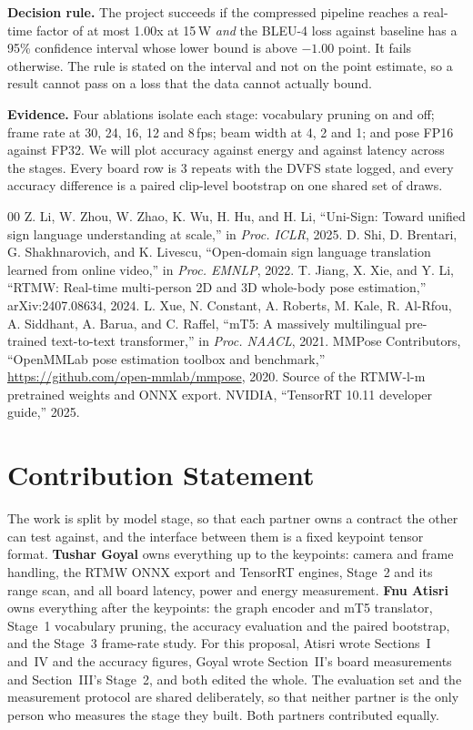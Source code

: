 \documentclass[conference]{IEEEtran}
\begin{document}
\label{m3}\textbf{Decision rule.} The project succeeds if the compressed pipeline reaches a
real-time factor of at most 1.00x at 15\,W \emph{and} the BLEU-4 loss against baseline
has a 95\% confidence interval whose lower bound is above $-1.00$ point. It fails
otherwise. The rule is stated on the interval and not on the point estimate, so a
result cannot pass on a loss that the data cannot actually bound.

\label{evidencestart}\textbf{Evidence.} Four ablations isolate each stage: vocabulary pruning on and off;
frame rate at 30, 24, 16, 12 and 8\,fps; beam width at 4, 2 and 1; and pose FP16
against FP32. We will plot accuracy against energy and against latency across the
stages. Every board row is 3 repeats with the DVFS state logged, and every accuracy
difference is a paired clip-level bootstrap on one shared set of draws.

\label{refsstart}
\begin{thebibliography}{00}
 Z. Li, W. Zhou, W. Zhao, K. Wu, H. Hu, and H. Li, ``Uni-Sign: Toward
unified sign language understanding at scale,'' in \emph{Proc. ICLR}, 2025.
 D. Shi, D. Brentari, G. Shakhnarovich, and K. Livescu, ``Open-domain
sign language translation learned from online video,'' in \emph{Proc. EMNLP}, 2022.
 T. Jiang, X. Xie, and Y. Li, ``RTMW: Real-time multi-person 2D and 3D
whole-body pose estimation,'' arXiv:2407.08634, 2024.
 L. Xue, N. Constant, A. Roberts, M. Kale, R. Al-Rfou, A. Siddhant,
A. Barua, and C. Raffel, ``mT5: A massively multilingual pre-trained text-to-text
transformer,'' in \emph{Proc. NAACL}, 2021.
 MMPose Contributors, ``OpenMMLab pose estimation toolbox and
benchmark,'' \url{https://github.com/open-mmlab/mmpose}, 2020. Source of the RTMW-l-m
pretrained weights and ONNX export.
 NVIDIA, ``TensorRT 10.11 developer guide,'' 2025.
\end{thebibliography}

\section*{Contribution Statement}\label{contribstart}

The work is split by model stage, so that each partner owns a contract the other can
test against, and the interface between them is a fixed keypoint tensor format.
\textbf{Tushar Goyal} owns everything up to the keypoints: camera and frame handling,
the RTMW ONNX export and TensorRT engines, Stage~2 and its range scan, and all board
latency, power and energy measurement. \textbf{Fnu Atisri} owns everything after the
keypoints: the graph encoder and mT5 translator, Stage~1 vocabulary pruning, the
accuracy evaluation and the paired bootstrap, and the Stage~3 frame-rate study.
For this proposal, Atisri wrote Sections~I and~IV and the accuracy figures, Goyal
wrote Section~II's board measurements and Section~III's Stage~2, and both edited the
whole. The evaluation set and the measurement protocol are shared deliberately, so
that neither partner is the only person who measures the stage they built. Both
partners contributed equally.
\end{document}
